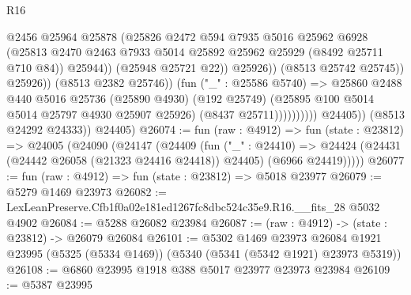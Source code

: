\begin{lexlean}{R16}
\begin{coremodule}
                                            @2456
                                            @25964
                                            @25878
                                            (@25826
                                              @2472
                                              @594
                                              @7935
                                              @5016
                                              @25962
                                              @6928
                                              (@25813
                                                @2470
                                                @2463
                                                @7933
                                                @5014
                                                @25892
                                                @25962
                                                @25929
                                                (@8492 @25711 @710 @84))
                                              @25944))
                                          (@25948 @25721 @22))
                                        @25926))
                                    (@8513 @25742 @25745))
                                  @25926))
                              (@8513 @2382 @25746))
                            (fun ("_" : @25586 @5740) =>
                            @25860
                              @2488
                              @440
                              @5016
                              @25736
                              (@25890 @4930)
                              (@192 @25749)
                              (@25895 @100 @5014 @5014 @25797 @4930 @25907 @25926)
                              (@8437 @25711))))))))))
            @24405))
        (@8513 @24292 @24333))
      @24405)
@26074 := fun (raw : @4912) =>
  fun (state : @23812) =>
  @24005
    (@24090
      (@24147
        (@24409
          (fun ("_" : @24410) =>
          @24424 (@24431 (@24442 @26058 (@21323 @24416 @24418)) @24405) (@6966 @24419)))))
@26077 := fun (raw : @4912) => fun (state : @23812) => @5018 @23977
@26079 := @5279 @1469 @23973
@26082 := LexLeanPreserve.Cfb1f0a02e181ed1267fc8dbc524c35e9.R16.__fits_28 @5032 @4902
@26084 := @5288 @26082 @23984
@26087 := (raw : @4912) -> (state : @23812) -> @26079 @26084
@26101 := @5302
    @1469
    @23973
    @26084
    @1921
    @23995
    (@5325 (@5334 @1469))
    (@5340 (@5341 (@5342 @1921) @23973 @5319))
@26108 := @6860 @23995 @1918 @388 @5017 @23977 @23973 @23984
@26109 := @5387 @23995

\end{coremodule}
\end{lexlean}
